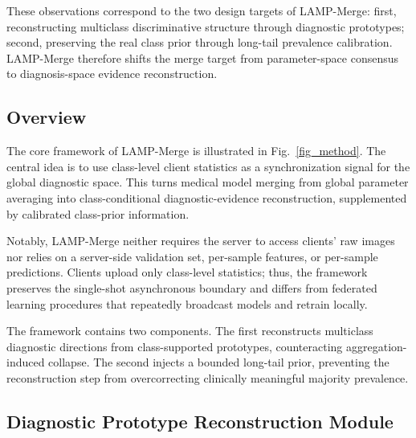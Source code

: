 \documentclass[letterpaper]{article} %
\begin{document}
These observations correspond to the two design targets of LAMP-Merge: first, reconstructing multiclass discriminative structure through diagnostic prototypes; second, preserving the real class prior through long-tail prevalence calibration. LAMP-Merge therefore shifts the merge target from parameter-space consensus to diagnosis-space evidence reconstruction.

\subsection{Overview}

The core framework of LAMP-Merge is illustrated in Fig.~\ref{fig_method}. The central idea is to use class-level client statistics as a synchronization signal for the global diagnostic space. This turns medical model merging from global parameter averaging into class-conditional diagnostic-evidence reconstruction, supplemented by calibrated class-prior information.

Notably, LAMP-Merge neither requires the server to access clients' raw images nor relies on a server-side validation set, per-sample features, or per-sample predictions. Clients upload only class-level statistics; thus, the framework preserves the single-shot asynchronous boundary and differs from federated learning procedures that repeatedly broadcast models and retrain locally.

The framework contains two components. The first reconstructs multiclass diagnostic directions from class-supported prototypes, counteracting aggregation-induced collapse. The second injects a bounded long-tail prior, preventing the reconstruction step from overcorrecting clinically meaningful majority prevalence.

\subsection{Diagnostic Prototype Reconstruction Module}
\end{document}
